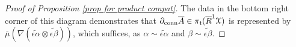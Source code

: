 \documentclass[11pt]{amsart} \renewcommand{\baselinestretch}{1.2}
\theoremstyle{plain}
\numberwithin{equation}{section} %
\theoremstyle{plain}
\numberwithin{equation}{chapter} %
\renewcommand{\to}{\longrightarrow}
\newcommand{\frakt}{\mathfrak{t}}
\newcommand{\fraks}{\mathfrak{s}}
\newcommand{\calx}{\mathcal{X}}
\newcommand{\Dendo}{R}
\begin{document}
\begin{Operations on the Bousfield-Kan spectral sequence}
\begin{proof}[Proof of Proposition \ref{prop for product compat}]
The data in the bottom right corner of this diagram demonstrates that $\partial_\textup{conn}\overline{A}\in\pi_\frakt(\overline{\Dendo}^1\calx )$ is represented by ${\overline{\mu}(\nabla(\widetilde{\epsilon\alpha} \otimes\widetilde{\epsilon\beta}))}$,
which suffices, as $\alpha\sim \widetilde{\epsilon\alpha}$ and $\beta\sim \widetilde{\epsilon\beta}$.
\end{proof}




\end{Operations on the Bousfield-Kan spectral sequence}
\end{document}
